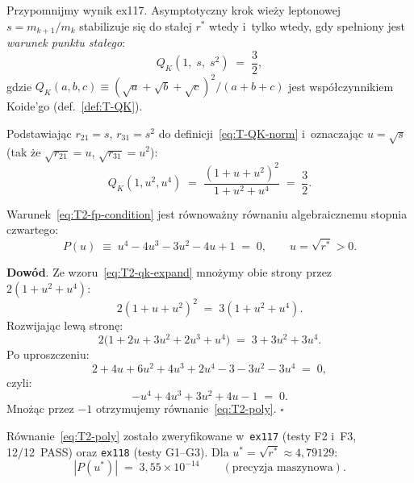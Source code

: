 Przypomnijmy wynik ex117.
Asymptotyczny krok wie\.zy leptonowej
$s = m_{k+1}/m_k$ stabilizuje si\k{e} do sta\l{}ej $r^*$
wtedy i~tylko wtedy, gdy spe\l{}niony jest \emph{warunek punktu sta\l{}ego}:
\begin{equation}\label{eq:T2-fp-condition}
  Q_K(1,\; s,\; s^2) \;=\; \frac{3}{2},
\end{equation}
gdzie $Q_K(a,b,c) \equiv (\sqrt{a}+\sqrt{b}+\sqrt{c})^2/(a+b+c)$
jest wsp\'o\l{}czynnikiem Koide'go (def.~\ref{def:T-QK}).

Podstawiaj\k{a}c $r_{21}=s$, $r_{31}=s^2$ do definicji~\eqref{eq:T-QK-norm}
i~oznaczaj\k{a}c $u = \sqrt{s}$ (tak \.ze $\sqrt{r_{21}}=u$,
$\sqrt{r_{31}}=u^2$):
\begin{equation}\label{eq:T2-qk-expand}
  Q_K(1, u^2, u^4)
    \;=\; \frac{(1 + u + u^2)^2}{1 + u^2 + u^4}
    \;=\; \frac{3}{2}.
\end{equation}

\begin{proposition}\label{prop:T2-poly}
Warunek~\eqref{eq:T2-fp-condition} jest r\'ownowa\.zny r\'ownaniu
algebraicznemu stopnia czwartego:
\begin{equation}\label{eq:T2-poly}
  P(u) \;\equiv\; u^4 - 4u^3 - 3u^2 - 4u + 1 \;=\; 0,
  \qquad u = \sqrt{r^*} > 0.
\end{equation}

\textbf{Dow\'od}.
Ze wzoru~\eqref{eq:T2-qk-expand} mno\.zymy obie strony przez
$2(1+u^2+u^4)$:
\begin{equation}
  2(1+u+u^2)^2 \;=\; 3(1+u^2+u^4).
\end{equation}
Rozwijaj\k{a}c lewą stron\k{e}:
\begin{equation}
  2\bigl(1 + 2u + 3u^2 + 2u^3 + u^4\bigr)
  \;=\; 3 + 3u^2 + 3u^4.
\end{equation}
Po uproszczeniu:
\begin{equation}
  2 + 4u + 6u^2 + 4u^3 + 2u^4
  - 3 - 3u^2 - 3u^4 \;=\; 0,
\end{equation}
czyli:
\begin{equation}
  -u^4 + 4u^3 + 3u^2 + 4u - 1 \;=\; 0.
\end{equation}
Mno\.z\k{a}c przez $-1$ otrzymujemy r\'ownanie~\eqref{eq:T2-poly}.
\hfill$\square$
\end{proposition}

\begin{remark}\label{rem:T2-verify}
R\'ownanie~\eqref{eq:T2-poly} zosta\l{}o zweryfikowane w~\texttt{ex117}
(testy F2 i~F3, 12/12~PASS) oraz \texttt{ex118} (testy G1--G3).
Dla $u^* = \sqrt{r^*} \approx 4{,}79129$:
\[
  |P(u^*)| \;=\; 3{,}55 \times 10^{-14}
  \qquad (\text{precyzja maszynowa}).
\]
\end{remark}


